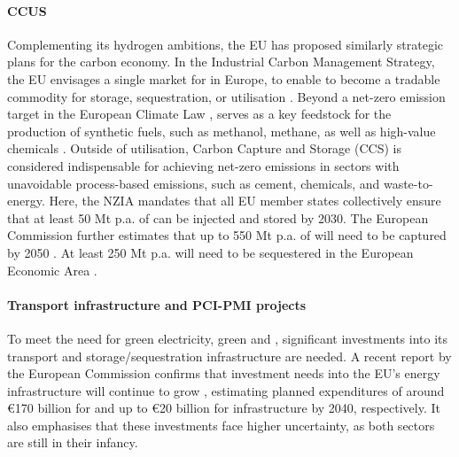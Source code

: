\documentclass[preprint,12pt,sort&compress]{elsarticle}
\begin{document}
\paragraph{CCUS}
Complementing its hydrogen ambitions, the EU has proposed similarly strategic plans for the carbon economy. In the Industrial Carbon Management Strategy, the EU envisages a single market for  in Europe, to enable  to become a tradable commodity for storage, sequestration, or utilisation \cite{europeancourtofauditorsEUsIndustrialPolicy2024}. Beyond a net-zero emission target in the European Climate Law \cite{europeanparliamentRegulationEU20212021},  serves as a key feedstock for the production of synthetic fuels, such as methanol, methane, as well as high-value chemicals \cite{neumannPotentialRoleHydrogen2023}. Outside of  utilisation, Carbon Capture and Storage (CCS) is considered indispensable for achieving net-zero emissions in sectors with unavoidable process-based  emissions, such as cement, chemicals, and waste-to-energy. Here, the NZIA mandates that all EU member states collectively ensure that at least 50 Mt p.a. of  can be injected and stored by 2030. The European Commission further estimates that up to 550 Mt p.a. of  will need to be captured by 2050 \cite{europeanparliamentRegulationEU20242024}. At least 250 Mt p.a. will need to be sequestered in the European Economic Area \cite{europeancommissionCommunicationCommissionEuropean2024}.

\paragraph{Transport infrastructure and PCI-PMI projects}
To meet the need for green electricity, green  and , significant investments into its transport and storage/sequestration infrastructure are needed. A recent report by the European Commission confirms that investment needs into the EU's energy infrastructure will continue to grow \cite{europeancommission.directorategeneralforenergy.InvestmentNeedsEuropean2025}, estimating planned expenditures of around \euro{170} billion for  and up to \euro{20} billion for  infrastructure by 2040, respectively. It also emphasises that these investments face higher uncertainty, as both sectors are still in their infancy. 
\end{document}
